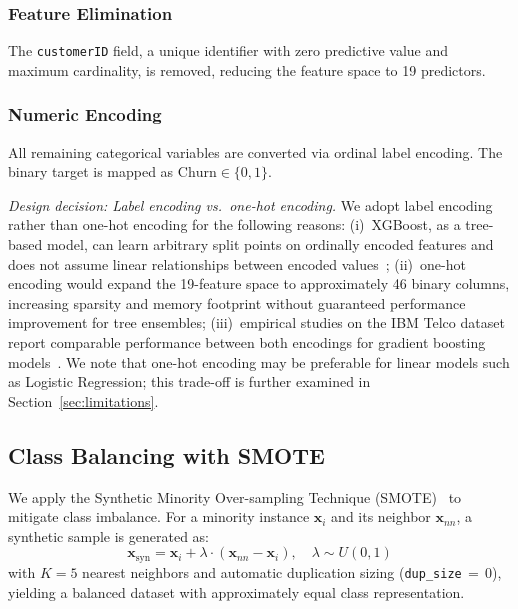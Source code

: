 \documentclass[10pt, conference, letterpaper]{IEEEtran}
\begin{document}
\subsubsection{Feature Elimination}
The \texttt{customerID} field, a unique identifier with zero predictive value and maximum cardinality, is removed, reducing the feature space to 19 predictors.

\subsubsection{Numeric Encoding}
\label{subsubsec:encoding}
All remaining categorical variables are converted via ordinal label encoding. The binary target is mapped as $\text{Churn} \in \{0, 1\}$.

\textit{Design decision: Label encoding vs.\ one-hot encoding.} We adopt label encoding rather than one-hot encoding for the following reasons: (i)~XGBoost, as a tree-based model, can learn arbitrary split points on ordinally encoded features and does not assume linear relationships between encoded values~\cite{chen2016xgboost}; (ii)~one-hot encoding would expand the 19-feature space to approximately 46 binary columns, increasing sparsity and memory footprint without guaranteed performance improvement for tree ensembles; (iii)~empirical studies on the IBM Telco dataset report comparable performance between both encodings for gradient boosting models~\cite{wagh2024churn}. We note that one-hot encoding may be preferable for linear models such as Logistic Regression; this trade-off is further examined in Section~\ref{sec:limitations}.

\subsection{Class Balancing with SMOTE}
\label{subsec:smote}

We apply the Synthetic Minority Over-sampling Technique (SMOTE)~\cite{chawla2002smote} to mitigate class imbalance. For a minority instance $\mathbf{x}_i$ and its neighbor $\mathbf{x}_{nn}$, a synthetic sample is generated as:
\begin{equation}
\mathbf{x}_{\text{syn}} = \mathbf{x}_i + \lambda \cdot (\mathbf{x}_{nn} - \mathbf{x}_i), \quad \lambda \sim U(0,1)
\label{eq:smote}
\end{equation}
with $K{=}5$ nearest neighbors and automatic duplication sizing (\texttt{dup\_size}$\,{=}\,0$), yielding a balanced dataset with approximately equal class representation.
\end{document}
